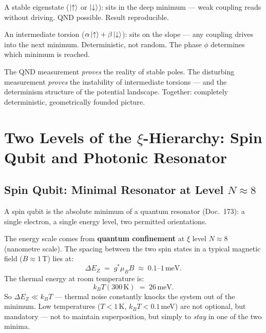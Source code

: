 \begin{keypoint}
A stable eigenstate ($\left|\uparrow\right\rangle$ or $\left|\downarrow\right\rangle$):
sits in the deep minimum --- weak coupling reads
without driving. QND possible. Result reproducible.

An intermediate torsion ($\alpha\left|\uparrow\right\rangle+\beta\left|\downarrow\right\rangle$):
sits on the slope --- any coupling drives
into the next minimum. Deterministic, not random.
The phase $\phi$ determines which minimum is reached.

The QND measurement \emph{proves} the reality of stable poles.
The disturbing measurement \emph{proves} the instability
of intermediate torsions --- and the determinism structure
of the potential landscape.
Together: completely deterministic,
geometrically founded picture.
\end{keypoint}

\section{Two Levels of the \texorpdfstring{$\xi$}{xi}-Hierarchy:
  Spin Qubit and Photonic Resonator}
\label{sec:two-levels}

\subsection{Spin Qubit: Minimal Resonator at Level \texorpdfstring{$N \approx 8$}{N≈8}}

A spin qubit is the absolute minimum of a
quantum resonator (Doc.~173):
a single electron, a single energy level,
two permitted orientations.

The energy scale comes from
\textbf{quantum confinement} at $\xi$ level $N \approx 8$
(nanometre scale).
The spacing between the two spin states
in a typical magnetic field ($B \approx 1$\,T)
lies at:
\begin{equation}
  \Delta E_Z \;=\; g^* \mu_B B \;\approx\; 0.1\text{--}1\,\text{meV}.
\end{equation}
The thermal energy at room temperature is:
\begin{equation}
  k_B T(300\,\text{K}) \;=\; 26\,\text{meV}.
\end{equation}
So $\Delta E_Z \ll k_BT$ --- thermal noise
constantly knocks the system out of the minimum.
Low temperatures ($T < 1$\,K, $k_BT < 0.1$\,meV)
are not optional, but mandatory ---
not to maintain superposition,
but simply to \emph{stay} in one of the two minima.

